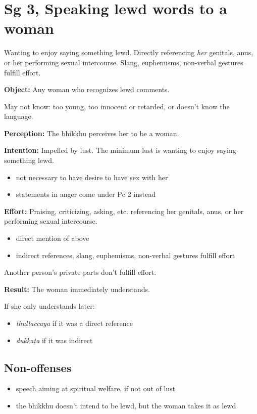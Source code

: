 \section{Sg 3, Speaking lewd words to a woman}

\begin{multicols}{2}

Wanting to enjoy saying something lewd. Directly referencing \emph{her}
genitals, anus, or her performing sexual intercourse. Slang, euphemisms,
non-verbal gestures fulfill effort.

\textbf{Object:} Any woman who recognizes lewd comments.

May not know: too young, too innocent or retarded, or doesn't know the
language.

\textbf{Perception:} The bhikkhu perceives her to be a woman.

\textbf{Intention:} Impelled by lust. The minimum lust is wanting to
enjoy saying something lewd.

\begin{itemize}
\tightlist
\item
  not necessary to have desire to have sex with her
\item
  statements in anger come under Pc 2 instead
\end{itemize}

\textbf{Effort:} Praising, criticizing, asking, etc. referencing her
genitals, anus, or her performing sexual intercourse.

\begin{itemize}
\tightlist
\item
  direct mention of above
\item
  indirect references, slang, euphemisms, non-verbal gestures fulfill
  effort
\end{itemize}

Another person's private parts don't fulfill effort.

\textbf{Result:} The woman immediately understands.

If she only understands later:

\begin{itemize}
\tightlist
\item
  \emph{thullaccaya} if it was a direct reference
\item
  \emph{dukkaṭa} if it was indirect
\end{itemize}

\subsection{Non-offenses}

\begin{itemize}
\tightlist
\item
  speech aiming at spiritual welfare, if not out of lust
\item
  the bhikkhu doesn't intend to be lewd, but the woman takes it as lewd
\end{itemize}

\end{multicols}

